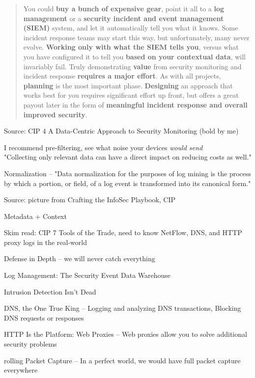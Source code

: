 \documentclass[Screen16to9,17pt]{foils}
\begin{document}


\begin{quote}\small
You could {\bf buy a bunch of expensive gear}, point it all to a {\bf log management} or a {\bf security incident and event management (SIEM)} system, and let it automatically tell you what it knows. Some incident response teams may start this way, but unfortunately, many never evolve. {\bf Working only with what the SIEM tells you}, versus what you have configured it to tell you {\bf based on your contextual data}, will invariably fail. Truly demonstrating {\bf value} from security monitoring and incident response {\bf requires a major effort}. As with all projects, {\bf planning} is the most important phase. {\bf Designing} an approach that works best for you requires significant effort up front, but offers a great payout later in the form of {\bf meaningful incident response and overall improved security}.
\end{quote}
Source: CIP 4 A Data-Centric Approach to Security Monitoring (bold by me)


\begin{list2}
\item I recommend pre-filtering, see what noise your devices \emph{would send}\\
"Collecting only relevant data can have a direct impact on reducing costs as well."
\item Normalization -- "Data normalization for
the purposes of log mining is the process by which a portion, or field, of a log event is
transformed into its canonical form."
\end{list2}



Source: picture from Crafting the InfoSec Playbook, CIP

Metadata + Context


\begin{list1}
\item Skim read: CIP 7 Tools of the Trade, need to know NetFlow, DNS, and HTTP proxy logs in the real-world
\begin{list2}
\item Defense in Depth -- we will never catch everything
\item Log Management: The Security Event Data Warehouse
\item Intrusion Detection Isn’t Dead
\item DNS, the One True King -- Logging and analyzing DNS transactions, Blocking DNS requests or responses
\item HTTP Is the Platform: Web Proxies -- Web proxies allow you to solve additional security problems
\item [rolling] Packet Capture -- In a perfect world, we would have full packet capture everywhere
\end{list2}
\end{list1}
\end{document}
